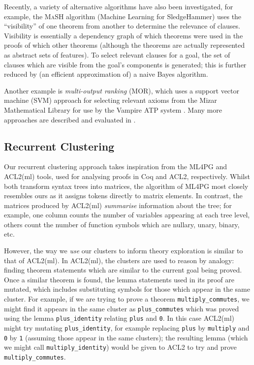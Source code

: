 Recently, a variety of alternative algorithms have also been investigated, for example, the \textsc{MaSH} algorithm (Machine Learning for SledgeHammer) \citep{kuhlwein2013mash} uses the ``visibility'' of one theorem from another to determine the relevance of clauses. Visibility is essentially a dependency graph of which theorems were used in the proofs of which other theorems (although the theorems are actually represented as abstract sets of features). To select relevant clauses for a goal, the set of clauses which are visible from the goal's components is generated; this is further reduced by (an efficient approximation of) a naive Bayes algorithm.

Another example is \emph{multi-output ranking} (MOR), which uses a support vector machine (SVM) approach for selecting relevant axioms from the Mizar Mathematical Library for use by the Vampire ATP system \citep{alama2014premise}. Many more approaches are described and evaluated in \citep{kuhlwein2012overview}.

\subsection{Recurrent Clustering}
\label{sec:clusteringexpressions}

Our recurrent clustering approach takes inspiration from the ML4PG \citep{journals/corr/abs-1212-3618} and ACL2(ml) \citep{heras2013proof} tools, used for analysing proofs in Coq and ACL2, respectively. Whilst both transform syntax trees into matrices, the algorithm of ML4PG most closely resembles ours as it assigns tokens directly to matrix elements. In contrast, the matrices produced by ACL2(ml) \emph{summarise} information about the tree; for example, one column counts the number of variables appearing at each tree level, others count the number of function symbols which are nullary, unary, binary, etc.

However, the way we \emph{use} our clusters to inform theory exploration is similar to that of ACL2(ml). In ACL2(ml), the clusters are used to reason by analogy: finding theorem statements which are similar to the current goal being proved. Once a similar theorem is found, the lemma statements used in its proof are mutated, which includes substituting symbols for those which appear in the same cluster. For example, if we are trying to prove a theorem \texttt{multiply\_commutes}, we might find it appears in the same cluster as \texttt{plus\_commutes} which was proved using the lemma \texttt{plus\_identity} relating \texttt{plus} and \texttt{0}. In this case ACL2(ml) might try mutating \texttt{plus\_identity}, for example replacing \texttt{plus} by \texttt{multiply} and \texttt{0} by \texttt{1} (assuming those appear in the same clusters); the resulting lemma (which we might call \texttt{multiply\_identity}) would be given to ACL2 to try and prove \texttt{multiply\_commutes}.

